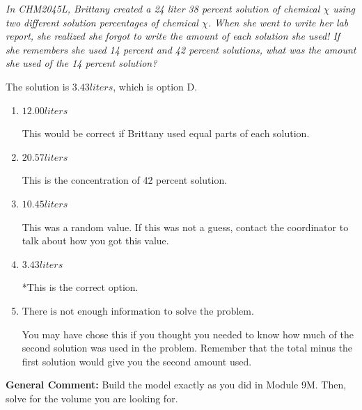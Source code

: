 \documentclass{extbook}[14pt]
\begin{document}
\begin{enumerate}
{\begin{center}
    \textit{ In CHM2045L, Brittany created a 24 liter 38 percent solution of chemical $\chi$ using two different solution percentages of chemical $\chi$. When she went to write her lab report, she realized she forgot to write the amount of each solution she used! If she remembers she used 14 percent and 42 percent solutions, what was the amount she used of the 14 percent solution? }
\end{center}
The solution is \( 3.43 liters \), which is option D.\begin{enumerate}[label=\Alph*.]
\item \( 12.00 liters \)

This would be correct if Brittany used equal parts of each solution.
\item \( 20.57 liters \)

This is the concentration of 42 percent solution.
\item \( 10.45 liters \)

This was a random value. If this was not a guess, contact the coordinator to talk about how you got this value.
\item \( 3.43 liters \)

*This is the correct option.
\item \( \text{There is not enough information to solve the problem.} \)

You may have chose this if you thought you needed to know how much of the second solution was used in the problem. Remember that the total minus the first solution would give you the second amount used.
\end{enumerate}

\textbf{General Comment:} Build the model exactly as you did in Module 9M. Then, solve for the volume you are looking for.
}
\end{enumerate}
\end{document}
